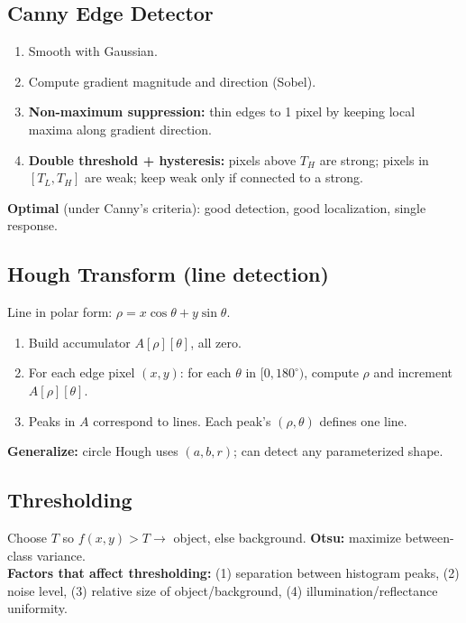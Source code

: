 \documentclass[10pt]{article}
\begin{document}
\subsection{Canny Edge Detector}
\begin{tcolorbox}[procbox]
\begin{enumerate}
  \item Smooth with Gaussian.
  \item Compute gradient magnitude and direction (Sobel).
  \item \textbf{Non-maximum suppression:} thin edges to 1 pixel by keeping local maxima along gradient direction.
  \item \textbf{Double threshold + hysteresis:} pixels above $T_H$ are strong; pixels in $[T_L,T_H]$ are weak; keep weak only if connected to a strong.
\end{enumerate}
\textbf{Optimal} (under Canny's criteria): good detection, good localization, single response.
\end{tcolorbox}

\subsection{Hough Transform (line detection)}
\begin{tcolorbox}[procbox]
Line in polar form: $\rho = x\cos\theta + y\sin\theta$.
\begin{enumerate}
  \item Build accumulator $A[\rho][\theta]$, all zero.
  \item For each edge pixel $(x,y)$: for each $\theta$ in $[0,180^\circ)$, compute $\rho$ and increment $A[\rho][\theta]$.
  \item Peaks in $A$ correspond to lines. Each peak's $(\rho,\theta)$ defines one line.
\end{enumerate}
\textbf{Generalize:} circle Hough uses $(a,b,r)$; can detect any parameterized shape.
\end{tcolorbox}

\subsection{Thresholding}
Choose $T$ so $f(x,y)>T \to$ object, else background. \textbf{Otsu:} maximize between-class variance.\\
\textbf{Factors that affect thresholding:} (1) separation between histogram peaks, (2) noise level, (3) relative size of object/background, (4) illumination/reflectance uniformity.
\end{document}
